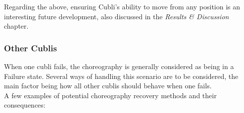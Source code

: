 Regarding the above, ensuring Cubli's ability to move from any position is an interesting future development, also discussed in the \textit{Results \& Discussion} chapter.



\subsubsection{Other Cublis}

When one cubli fails, the choreography is generally considered as being in a Failure state. Several ways of handling this scenario are to be considered, the main factor being how all other cublis should behave when one fails.\\

A few examples of potential choreography recovery methods and their consequences:\\

